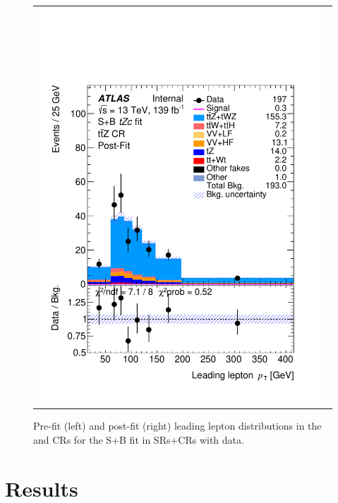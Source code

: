 \begin{figure}[htbp]
\begin{tabular}{cc}
		\includegraphics[width=.45\textwidth]{Chapters/CH8/figures/SPLUSB_CRSR_DL1rc_unblind/Plots/TTZCR_postFit} \\
	\end{tabular}
	\caption{Pre-fit (left) and post-fit (right) leading lepton \pt distributions in the \ttbar and \ttZ CRs for the S+B \tZc fit in SRs+CRs with data.
		\ErrStatSys
	}%
	\label{fig:stat:tzc:splusb:crsr:crplots:2_unb}
\end{figure}

\clearpage
\section{Results}
\label{sec:stat:tzc}
